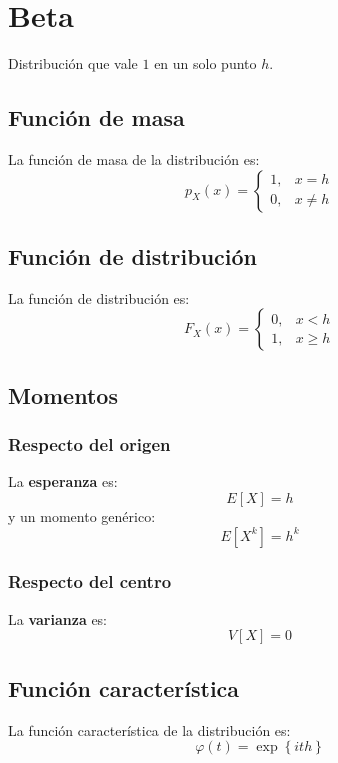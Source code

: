 \section{Beta}
\label{sec:beta}
Distribución que vale $1$ en un solo punto $h$.

\subsection{Función de masa}
La función de masa de la distribución es:
\[
p_X \left( x \right) = \begin{cases}
    1, &x = h\\
    0, &x \neq h
\end{cases}
\]

\subsection{Función de distribución}
La función de distribución es:
\[
F_X\left( x \right) = \begin{cases}
    0, &x < h\\ 
    1, &x \ge h
\end{cases}
\]

\subsection{Momentos}

\subsubsection*{Respecto del origen}
La \textbf{esperanza} es: 
\[
    E\left[ X \right] = h
\]
y un momento genérico: 
\[
    E\left[ X^k \right] = h^k
\]
\subsubsection*{Respecto del centro}
La \textbf{varianza} es:
\[
    V\left[ X \right] = 0
\]

\subsection{Función característica}
La función característica de la distribución es:
\[
\varphi\left( t \right) = \exp\left\{ ith \right\}
\]


